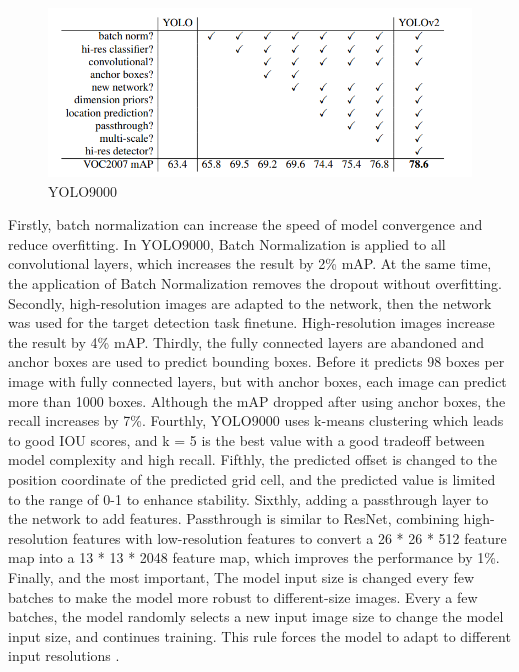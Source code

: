\documentclass{article}
\begin{document}
\begin{figure}[h]
\centering
\includegraphics[scale=0.6]{YOLOv2.PNG}
\caption{YOLO9000\cite{YOLO9000}}
\label{fig:YOLO9000}
\end{figure}

Firstly, batch normalization can increase the speed of model convergence and reduce overfitting. In YOLO9000, Batch Normalization is applied to all convolutional layers, which increases the result by 2\% mAP. At the same time, the application of Batch Normalization removes the dropout without overfitting. Secondly, high-resolution images are adapted to the network, then the network was used for the target detection task finetune. High-resolution images increase the result by 4\% mAP. Thirdly, the fully connected layers are abandoned and anchor boxes are used to predict bounding boxes. Before it predicts 98 boxes per image with fully connected layers, but with anchor boxes, each image can predict more than 1000 boxes. Although the mAP dropped after using anchor boxes, the recall increases by 7\%. Fourthly,  YOLO9000 uses k-means clustering which leads to good IOU scores, and k = 5 is the best value with a good tradeoff between model complexity and high recall. Fifthly, the predicted offset is changed to the position coordinate of the predicted grid cell, and the predicted value is limited to the range of 0-1 to enhance stability. Sixthly, adding a passthrough layer to the network to add features. Passthrough is similar to ResNet, combining high-resolution features with low-resolution features to convert a 26 * 26 * 512 feature map into a 13 * 13 * 2048 feature map, which improves the performance by 1\%. Finally, and the most important, The model input size is changed every few batches to make the model more robust to different-size images. Every a few batches, the model randomly selects a new input image size to change the model input size, and continues training. This rule forces the model to adapt to different input resolutions \cite{YOLO9000}.
\end{document}
